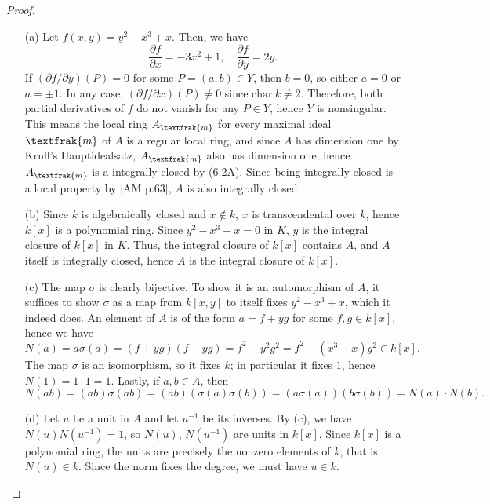 \documentclass[12pt]{article}
\newcommand{\goth}[1]{\textfrak{#1}}
\newcommand{\pd}[2]{\frac{\partial #1}{\partial #2}}
\theoremstyle{definition}
\begin{document}
\begin{enumerate} [label=\textbf{\arabic*.}, leftmargin=-0.05em]
\begin{proof} $ $ \vspace{0pt}
  \begin{itemize}
    \item[(a)] Let $f(x, y) = y^2 - x^3 + x$. Then, we have
    \begin{equation*}
      \pd{f}{x} = -3x^2 + 1, \quad \pd{f}{y} = 2y.
    \end{equation*}
    If $(\partial f / \partial y)(P) = 0$ for some $P = (a, b) \in Y$, then $b = 0$, so either $a = 0$ or $a = \pm 1$. In any case, $(\partial f / \partial x)(P) \neq 0$ since $\text{char}~k \neq 2$. Therefore, both partial derivatives of $f$ do not vanish for any $P \in Y$, hence $Y$ is nonsingular. This means the local ring $A_\goth{m}$ for every maximal ideal $\goth{m}$ of $A$ is a regular local ring, and since $A$ has dimension one by Krull's Hauptidealsatz, $A_\goth{m}$ also has dimension one, hence $A_\goth{m}$ is a integrally closed by (6.2A). Since being integrally closed is a local property by [AM p.63], $A$ is also integrally closed.

    \item[(b)] Since $k$ is algebraically closed and $x \notin k$, $x$ is transcendental over $k$, hence $k[x]$ is a polynomial ring. Since $y^2 - x^3 + x = 0$ in $K$, $y$ is the integral closure of $k[x]$ in $K$. Thus, the integral closure of $k[x]$ contains $A$, and $A$ itself is integrally closed, hence $A$ is the integral closure of $k[x]$.

    \item[(c)] The map $\sigma$ is clearly bijective. To show it is an automorphism of $A$, it suffices to show $\sigma$ as a map from $k[x, y]$ to itself fixes $y^2 - x^3 + x$, which it indeed does. An element of $A$ is of the form $a = f + yg$ for some $f, g \in k[x]$, hence we have
    \begin{equation*}
      N(a) = a \sigma(a) = (f + yg)(f - yg) = f^2 - y^2g^2 = f^2 - (x^3 - x)g^2 \in k[x].
    \end{equation*}
    The map $\sigma$ is an isomorphism, so it fixes $k$; in particular it fixes $1$, hence $N(1) = 1 \cdot 1 = 1$. Lastly, if $a, b \in A$, then
    \begin{equation*}
      N(ab) = (ab) \sigma(ab) = (ab)(\sigma(a) \sigma(b)) = (a \sigma(a))(b \sigma(b)) = N(a) \cdot N(b).
    \end{equation*}

    \item[(d)] Let $u$ be a unit in $A$ and let $u^{-1}$ be its inverses. By (c), we have $N(u) N(u^{-1}) = 1$, so $N(u)$, $N(u^{-1})$ are units in $k[x]$. Since $k[x]$ is a polynomial ring, the units are precisely the nonzero elements of $k$, that is $N(u) \in k$. Since the norm fixes the degree, we must have $u \in k$.


\end{itemize}
\end{proof}
\end{enumerate}
\end{document}
